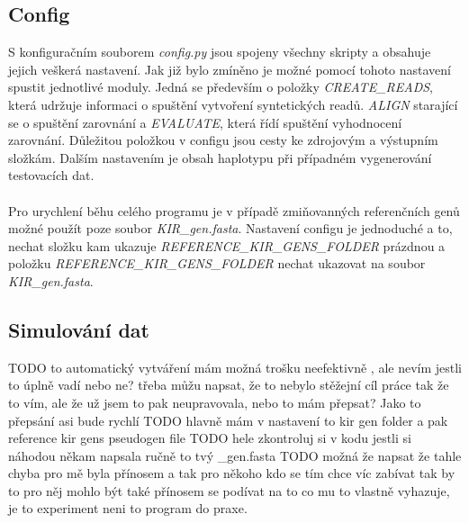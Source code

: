 \documentclass[czech,DP]{thesiskiv}
\numberwithin{equation}{section}
\begin{document}
\subsection{Config}
S konfiguračním souborem \textit{config.py} jsou spojeny všechny skripty a obsahuje jejich veškerá nastavení. Jak již bylo zmíněno je možné pomocí tohoto nastavení spustit jednotlivé moduly. Jedná se především o položky \textit{CREATE\_READS}, která udržuje informaci o spuštění vytvoření syntetických readů. \textit{ALIGN} starající se o spuštění zarovnání a \textit{EVALUATE}, která řídí spuštění vyhodnocení zarovnání. Důležitou položkou v configu jsou cesty ke zdrojovým a výstupním složkám. Dalším nastavením je obsah haplotypu při případném vygenerování testovacích dat.
\\
\\
Pro urychlení běhu celého programu je v případě zmiňovanných referenčních genů možné použít poze soubor \textit{KIR\_gen.fasta}. Nastavení configu je jednoduché a to, nechat složku kam ukazuje \textit{REFERENCE\_KIR\_GENS\_FOLDER} prázdnou a položku \textit{REFERENCE\_KIR\_GENS\_FOLDER} nechat ukazovat na soubor \textit{KIR\_gen.fasta}.

\subsection{Simulování dat}
TODO to automatický vytváření mám možná trošku neefektivně , ale nevím jestli to úplně vadí nebo ne? 
třeba můžu napsat, že to nebylo stěžejní cíl práce tak že to vím, ale že už jsem to pak neupravovala, nebo to mám přepsat? Jako to přepsání asi bude rychlí
TODO hlavně mám v nastavení to kir gen folder a pak reference kir gens pseudogen file
TODO hele zkontroluj si v kodu jestli si náhodou někam napsala ručně to tvý \_gen.fasta
TODO možná že napsat že tahle chyba pro mě byla přínosem a tak pro někoho kdo se tím chce víc zabívat tak by to pro něj mohlo být také přínosem se podívat na to co mu to vlastně vyhazuje, je to experiment neni to program do praxe.
\end{document}
